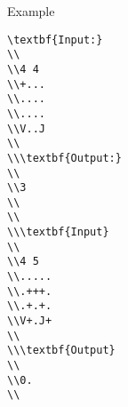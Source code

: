 Example
\begin{verbatim}
\textbf{Input:}
\\
\\4 4
\\+...
\\....
\\....
\\V..J
\\
\\\textbf{Output:}
\\
\\3
\\
\\
\\\textbf{Input}
\\
\\4 5
\\.....
\\.+++.
\\.+.+.
\\V+.J+
\\
\\\textbf{Output}
\\
\\0.
\\\end{verbatim}